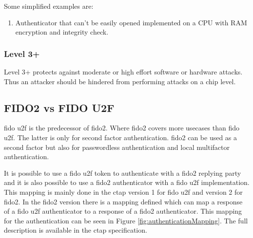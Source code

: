 \documentclass[a4paper, 11pt]{scrartcl}
\begin{document}
Some simplified examples are:
\begin{enumerate}
  \item Authenticator that can't be easily opened implemented on a CPU with RAM encryption and integrity check.
\end{enumerate}

\subsubsection{Level 3+}
Level 3+ protects against moderate or high effort software or hardware attacks. Thus an attacker should be hindered from performing attacks on a chip level. \cite{fido:authenticator:level3_plus}

\subsection{FIDO2 vs FIDO U2F}

\gls{fido} \gls{u2f} is the predecessor of \gls{fido2}. Where \gls{fido2} covers more usecases than \gls{fido} \gls{u2f}. The latter is only for second factor authentication. \gls{fido2} can be used as a second factor but also for passwordless authentication and local multifactor authentication. \cite{yubico:whatIsFido2}

It is possible to use a \gls{fido} \gls{u2f} token to authenticate with a \gls{fido2} replying party and it is also possible to use a \gls{fido2} authenticator with a \gls{fido} \gls{u2f} implementation. This mapping is mainly done in the \gls{ctap} version 1 for \gls{fido} \gls{u2f} and version 2 for \gls{fido2}. In the \gls{fido2} version there is a mapping defined which can map a response of a \gls{fido} \gls{u2f} authenticator to a response of a \gls{fido2} authenticator. This mapping for the authentication can be seen in Figure \ref{fig:authenticationMapping}. The full description is available in the \gls{ctap} specification. \cite{yubico:whatIsFido2, ctap:interoperability}
\end{document}

